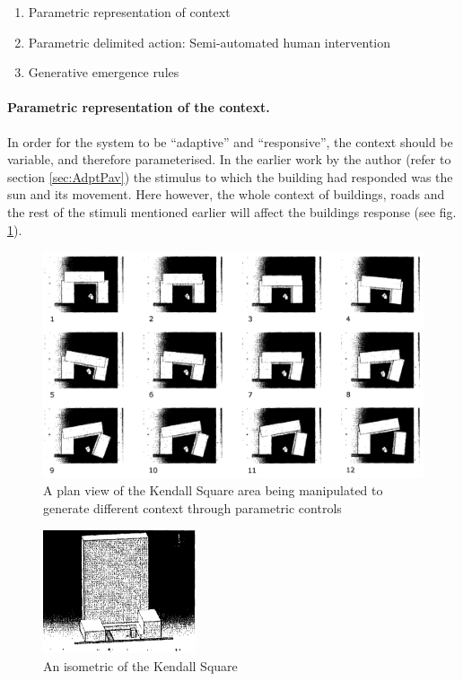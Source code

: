 \begin{enumerate}[nolistsep]
\item Parametric representation of context
\item Parametric delimited action: Semi-automated human intervention
\item Generative emergence rules
\end{enumerate}

\paragraph{Parametric representation of the context.}\mbox{}
In order for the system to be ``adaptive'' and ``responsive'', the context should be variable, and therefore parameterised. In the earlier work by the author (refer to section \ref{sec:AdptPav}) the stimulus to which the building had responded was the sun and its movement. Here however, the whole context of buildings, roads and the rest of the stimuli mentioned earlier will affect the buildings response (see fig. \ref{fig:ParametricKendallSq}).

\begin{figure}[htbp]
\centering
\includegraphics[width=\textwidth]{./Images/12-ParametricContext}
\caption[Parametric Context]{A plan view of the Kendall Square area being manipulated to generate different context through parametric controls \cite {zulas04}}
\label{fig:ParametricKendallSq}
\end{figure}

\begin{figure}[htbp]
\centering
\includegraphics[width=0.4\textwidth]{./Images/13-KendallIsometric}
\caption[Kendall Square Isometric]{An isometric of the Kendall Square \cite{zulas04}}
\label{fig:KendallIsom}
\end{figure}

